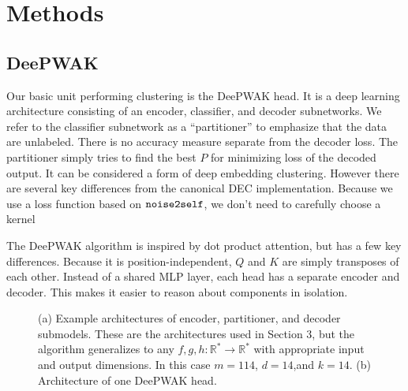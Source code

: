 \section{Methods}

\subsection{DeePWAK}

Our basic unit performing clustering is the DeePWAK head.
It is a deep learning architecture consisting of an encoder, classifier, and decoder subnetworks.
We refer to the classifier subnetwork as a ``partitioner'' to emphasize that the data are unlabeled.
There is no accuracy measure separate from the decoder loss.
The partitioner simply tries to find the best $P$ for minimizing loss of the decoded output.
It can be considered a form of deep embedding clustering\cite{xie2016unsupervised}.
However there are several key differences from the canonical DEC implementation.
Because we use a loss function based on $\mathop{\mathtt{noise2self}}\limits$, we don't need to carefully choose a kernel

The DeePWAK algorithm is inspired by dot product attention, but has a few key differences. Because it is position-independent, $Q$ and $K$ are simply transposes of each other. Instead of a shared MLP layer, each head has a separate encoder and decoder. This makes it easier to reason about components in isolation.






  
\begin{figure}
     \begin{subfigure}[b]{0.5\textwidth}
        
         \caption{}
         \label{fig:}
     \end{subfigure}
     \hfill
     \begin{subfigure}[b]{0.5\textwidth}
        
         \caption{}
         \label{fig:}
     \end{subfigure}

     \caption{
       (a) Example architectures of encoder, partitioner, and decoder submodels. These are the architectures used in Section 3, but the algorithm generalizes to any $f,g,h:\mathbb{R}^* \to \mathbb{R}^*$ with appropriate input and output dimensions. In this case $m=114$, $d=14$,and $k=14$.
       (b) Architecture of one DeePWAK head.
     }
     \label{fig:}
\end{figure}
  
